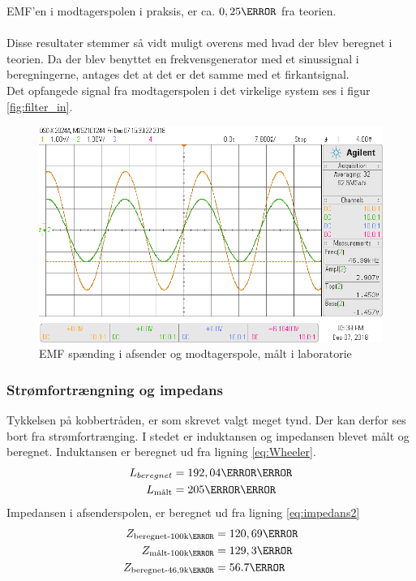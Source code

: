 EMF'en i modtagerspolen i praksis, er ca. $0,25\volt$ fra teorien.\\ \\
Disse resultater stemmer så vidt muligt overens med hvad der blev beregnet i teorien. Da der blev benyttet en frekvensgenerator med et sinussignal i beregningerne, antages det at det er det samme med et firkantsignal. \\
Det opfangede signal fra modtagerspolen i det virkelige system ses i figur \ref{fig:filter_in}.

\begin{figure}[h!]
	\centering
	\includegraphics[width=1\textwidth]{billeder/vin_vout_png.png}
	\caption{EMF spænding i afsender og modtagerspole, målt i laboratorie}
	\label{fig:EMF_spole_lab}
\end{figure}


\subsubsection{Strømfortrængning og impedans}
Tykkelsen på kobbertråden, er som skrevet valgt meget tynd. Der kan derfor ses bort fra strømfortrænging.
I stedet er induktansen og impedansen blevet målt og beregnet.
Induktansen er beregnet ud fra ligning \ref{eq:Wheeler}.
\begin{align}
	 L_{beregnet} &= 192,04\micro\henry\nonumber\\
     L_{\text{målt}} &= 205\micro\henry\nonumber
\end{align}
Impedansen i afsenderspolen, er beregnet ud fra ligning \ref{eq:impedans2}
\begin{align}
	 Z_{\text{beregnet-100k\hertz}}&=120,69\ohm\nonumber\\
	 Z_{\text{målt-100k\hertz}}&=129,3\ohm\nonumber\\
	 Z_{\text{beregnet-46,9k\hertz}}&= 56.7\ohm\nonumber               
\end{align}
